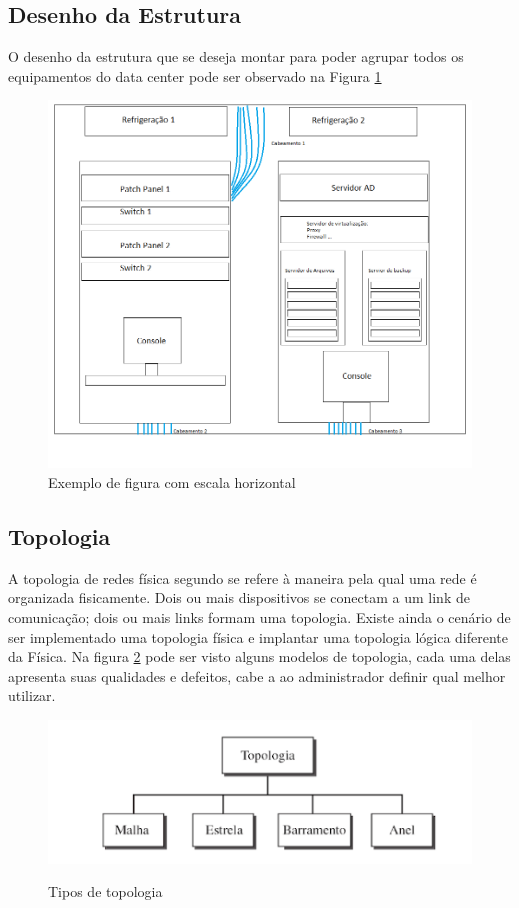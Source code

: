 \documentclass[	DIV=calc,%
							paper=a4,%
							fontsize=12pt,%
							onecolumn]{scrartcl}	 					%
\begin{document}
\subsection{Desenho da Estrutura} 
O desenho da estrutura que se deseja montar para poder agrupar todos os equipamentos do data center pode ser observado na Figura \ref{fig:desenhoestrutura}

\begin{figure}[!htbp]
	\centering
	\includegraphics[width=\textwidth]{./imagens/datacenter.png}
	\caption{Exemplo de figura com escala horizontal}
	\label{fig:desenhoestrutura}
\end{figure}

	
\subsection{Topologia}
A topologia de redes física segundo \cite{forouzan2007} se refere à maneira pela qual uma rede é organizada fisicamente. Dois ou mais dispositivos se conectam a um link de comunicação; dois ou mais links formam uma topologia. Existe ainda o cenário de ser implementado uma topologia física e implantar uma topologia lógica diferente da Física. Na figura \ref{fig:tipos_topologias} pode ser visto alguns modelos de topologia, cada uma delas apresenta suas qualidades e defeitos, cabe a ao administrador definir qual melhor utilizar.

\begin{figure}[!htbp]
	\centering
	\includegraphics[width=\textwidth]{./imagens/tipos_topologia.png}
	\caption{Tipos de topologia}
	\cite{forouzan2007}
	\label{fig:tipos_topologias}
\end{figure}
 
\end{document}
